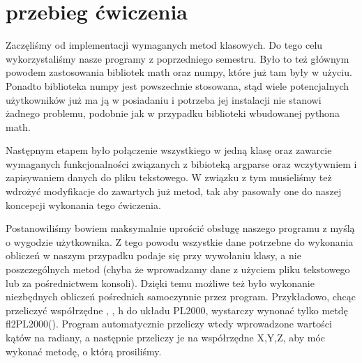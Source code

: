 	\section{przebieg ćwiczenia}
	
	Zaczęliśmy od implementacji wymaganych metod klasowych. Do tego celu wykorzystaliśmy nasze programy z poprzedniego semestru. Było to też głównym powodem zastosowania bibliotek math oraz numpy, które już tam były w użyciu. Ponadto biblioteka numpy jest powszechnie stosowana, stąd wiele potencjalnych użytkowników już ma ją w posiadaniu i potrzeba jej instalacji nie stanowi żadnego problemu, podobnie jak w przypadku biblioteki wbudowanej pythona math.
	
	Następnym etapem było połączenie wszystkiego w jedną klasę oraz zawarcie wymaganych funkcjonalności związanych z bibioteką argparse oraz wczytywniem i zapisywaniem danych do pliku tekstowego. W związku z tym musieliśmy też wdrożyć modyfikacje do zawartych już metod, tak aby pasowały one do naszej koncepcji wykonania tego ćwiczenia.
	
	Postanowiliśmy bowiem maksymalnie uprościć obsługę naszego programu z myślą o wygodzie użytkownika. Z tego powodu wszystkie dane potrzebne do wykonania obliczeń w naszym przypadku podaje się przy wywołaniu klasy, a nie poszczególnych metod (chyba że wprowadzamy dane z użyciem pliku tekstowego lub za pośrednictwem konsoli). Dzięki temu możliwe też było wykonanie niezbędnych obliczeń pośrednich samoczynnie przez program. Przykładowo, chcąc przeliczyć współrzędne \textphi, \textlambda , h do układu PL2000, wystarczy wynonać tylko metdę fl2PL2000(). Program automatycznie przeliczy wtedy wprowadzone wartości kątów na radiany, a następnie przeliczy je na współrzędne X,Y,Z, aby móc wykonać metodę, o którą prosiliśmy.
	
